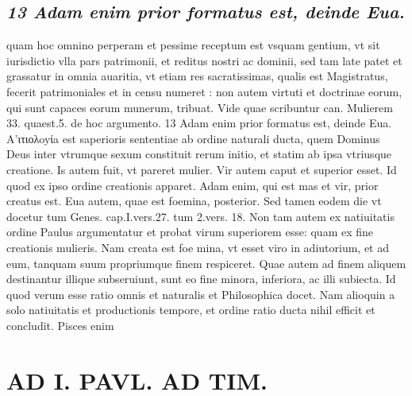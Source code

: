 \documentclass{article}
\begin{document}
\begin{pages}
\subsection*{\textit{13 Adam enim prior formatus est, deinde Eua.}}quam hoc omnino perperam et pessime receptum est vsquam gentium, vt sit iurisdictio vlla pars patrimonii, et reditus nostri ac dominii, sed tam late patet et grassatur in omnia auaritia, vt etiam res sacratissimas, qualis est Magistratus, fecerit patrimoniales et in censu numeret : non autem virtuti et doctrinae eorum, qui sunt capaces eorum munerum, tribuat. Vide quae scribuntur can. Mulierem 33. quaest.5. de hoc argumento. 13 Adam enim prior formatus est, deinde Eua. A’ιτιολoyίa est saperioris sententiae ab ordine naturali ducta, quem Dominus Deus inter vtrumque sexum constituit rerum initio, et statim ab ipsa vtriusque creatione. Is autem fuit, vt pareret mulier. Vir autem caput et superior esset. Id quod ex ipso ordine creationis apparet. Adam enim, qui est mas et vir, prior creatus est. Eua autem, quae est foemina, posterior. Sed tamen eodem die vt docetur tum Genes. cap.I.vers.27. tum 2.vers. 18. Non tam autem ex natiuitatis ordine Paulus argumentatur et probat virum superiorem esse: quam ex fine creationis mulieris. Nam creata est foe mina, vt esset viro in adiutorium, et ad eum, tanquam suum propriumque finem respiceret. Quae autem ad finem aliquem destinantur illique subseruiunt, sunt eo fine minora, inferiora, ac illi subiecta. Id quod verum esse ratio omnis et naturalis et Philosophica docet. Nam alioquin a solo natiuitatis et productionis tempore, et ordine ratio ducta nihil efficit et concludit. Pisces enim  \pend
\section*{AD I. PAVL. AD TIM. }
\marginpar{[ p.88 ]}\pstart {}
{}

\end{pages}
\end{document}
